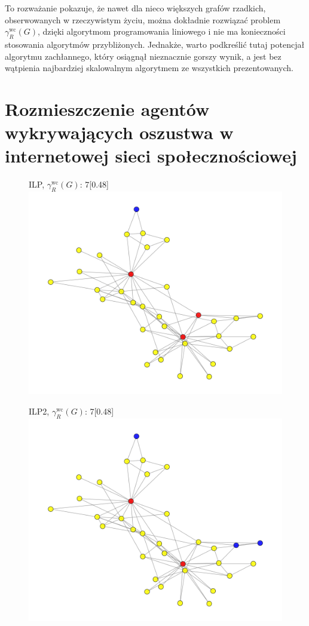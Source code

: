 To rozważanie pokazuje, że nawet dla nieco większych grafów rzadkich, obserwowanych w rzeczywistym życiu, można dokładnie rozwiązać problem $\gamma^{\text{wc}}_R(G)$, dzięki algorytmom programowania liniowego i nie ma konieczności stosowania algorytmów przybliżonych. Jednakże, warto podkreślić tutaj potencjał algorytmu zachłannego, który osiągnął nieznacznie gorszy wynik, a jest bez wątpienia najbardziej skalowalnym algorytmem ze wszystkich prezentowanych.

\section{Rozmieszczenie agentów wykrywających oszustwa w internetowej sieci społecznościowej}

\begin{figure}[htbp]
    \centering
    \begin{subcaptionbox}{ILP, $\gamma^{\text{wc}}_R(G)$: 7\label{fig:ilp}}[0.48\linewidth]
        {\includegraphics[width=\linewidth]{assets/Facebook/ilp.png}}
    \end{subcaptionbox}
    \hfill
    \begin{subcaptionbox}{ILP2,  $\gamma^{\text{wc}}_R(G)$: 7\label{fig:ilp2}}[0.48\linewidth]
        {\includegraphics[width=\linewidth]{assets/Facebook/ilp2.png}}

\end{subcaptionbox}
\end{figure}
